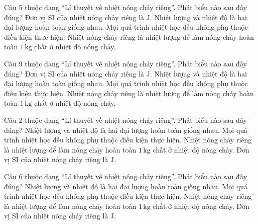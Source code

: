 \begin{ex}
Câu 5 thuộc dạng “Lí thuyết về nhiệt nóng chảy riêng”. Phát biểu nào sau đây đúng?
\choice
{Đơn vị SI của nhiệt nóng chảy riêng là J.}
{Nhiệt lượng và nhiệt độ là hai đại lượng hoàn toàn giống nhau.}
{Mọi quá trình nhiệt học đều không phụ thuộc điều kiện thực hiện.}
{\True Nhiệt nóng chảy riêng là nhiệt lượng để làm nóng chảy hoàn toàn $1\,\text{kg}$ chất ở nhiệt độ nóng chảy.}
\end{ex}

\begin{ex}
Câu 9 thuộc dạng “Lí thuyết về nhiệt nóng chảy riêng”. Phát biểu nào sau đây đúng?
\choice
{Đơn vị SI của nhiệt nóng chảy riêng là J.}
{Nhiệt lượng và nhiệt độ là hai đại lượng hoàn toàn giống nhau.}
{Mọi quá trình nhiệt học đều không phụ thuộc điều kiện thực hiện.}
{\True Nhiệt nóng chảy riêng là nhiệt lượng để làm nóng chảy hoàn toàn $1\,\text{kg}$ chất ở nhiệt độ nóng chảy.}
\end{ex}

\begin{ex}
Câu 2 thuộc dạng “Lí thuyết về nhiệt nóng chảy riêng”. Phát biểu nào sau đây đúng?
\choice
{Nhiệt lượng và nhiệt độ là hai đại lượng hoàn toàn giống nhau.}
{Mọi quá trình nhiệt học đều không phụ thuộc điều kiện thực hiện.}
{\True Nhiệt nóng chảy riêng là nhiệt lượng để làm nóng chảy hoàn toàn $1\,\text{kg}$ chất ở nhiệt độ nóng chảy.}
{Đơn vị SI của nhiệt nóng chảy riêng là J.}
\end{ex}

\begin{ex}
Câu 6 thuộc dạng “Lí thuyết về nhiệt nóng chảy riêng”. Phát biểu nào sau đây đúng?
\choice
{Nhiệt lượng và nhiệt độ là hai đại lượng hoàn toàn giống nhau.}
{Mọi quá trình nhiệt học đều không phụ thuộc điều kiện thực hiện.}
{\True Nhiệt nóng chảy riêng là nhiệt lượng để làm nóng chảy hoàn toàn $1\,\text{kg}$ chất ở nhiệt độ nóng chảy.}
{Đơn vị SI của nhiệt nóng chảy riêng là J.}
\end{ex}

